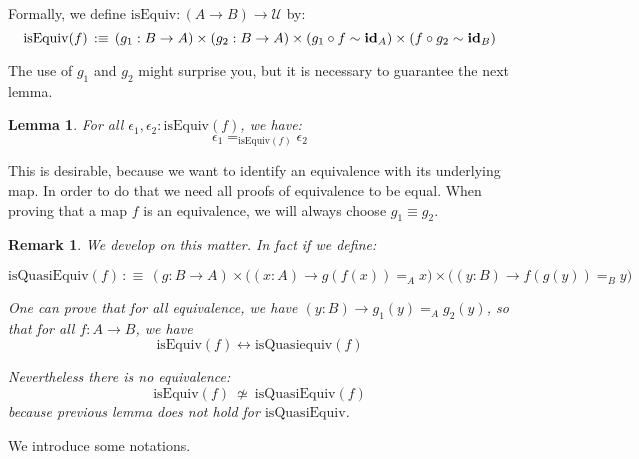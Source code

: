 \documentclass{article}
\newcommand{\U}{{\mathcal U}}
\renewcommand{\r}{\rightarrow}
\newcommand{\id}{\mathrm{\bf id}}
\newtheorem{lemma}{Lemma}
\newtheorem{remark}{Remark}
\begin{document}
Formally, we define $\mathrm{isEquiv} : (A \r B)\r \U$ by:
\[\mathrm{isEquiv}(f) \, :\equiv\, (g_1:B\r A)\times (g_2:B\r A)\times (g_1\circ f \sim \id_A) \times (f\circ g_2 \sim \id_B)\]



The use of $g_1$ and $g_2$ might surprise you, but it is necessary to guarantee the next lemma.



\begin{lemma}
For all $\epsilon_1,\epsilon_2:\mathrm{isEquiv}(f)$, we have:
\[\epsilon_1 =_{\mathrm{isEquiv}(f)} \epsilon_2\]
\end{lemma}

This is desirable, because we want to identify an equivalence with its underlying map. In order to do that we need all proofs of equivalence to be equal. %
When proving that a map $f$ is an equivalence, we will always choose $g_1 \equiv g_2$.

\begin{remark}
We develop on this matter. In fact if we define:

\[\mathrm{isQuasiEquiv}(f) \, :\equiv\, (g:B\r A)\times \big((x:A)\r g(f(x))=_A x \big)\times\big((y:B)\r f(g(y)) =_B y\big)\]

One can prove that for all equivalence, we have $(y:B)\r g_1(y) =_A g_2(y)$, so that for all $f:A\r B$, we have 
\[\mathrm{isEquiv}(f) \leftrightarrow \mathrm{isQuasiequiv}(f)\]

Nevertheless there is no equivalence:
\[\mathrm{isEquiv}(f)\ \not\simeq \ \mathrm{isQuasiEquiv}(f)\]
because previous lemma does not hold for $\mathrm{isQuasiEquiv}$.
\end{remark}




We introduce some notations.
\end{document}
